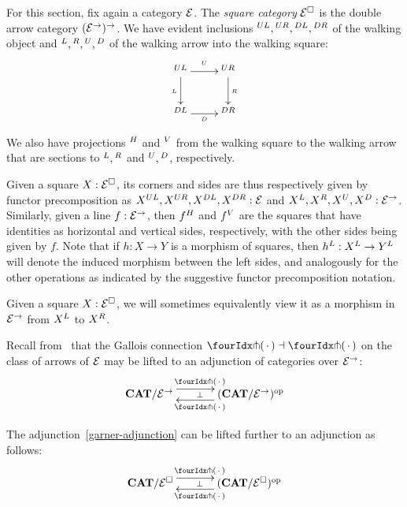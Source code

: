 \documentclass[reqno,10pt,a4paper,oneside]{amsart}
\begin{document}
For this section, fix again a category $\mathcal{E}$.
The \emph{square category} $\mathcal{E}^{\Box}$ is the double arrow category $(\mathcal{E}^{\to})^{\to}$.
We have evident inclusions ${}^{UL}, {}^{UR}, {}^{DL}, {}^{DR}$ of the walking object and ${}^L, {}^R, {}^U, {}^D$ of the walking arrow into the walking square:
\[
\xymatrix{
  \squl
  \ar[r]^{\squ}
  \ar[d]_{\sql}
  \ar@{}[dr]
&
  \squr
  \ar[d]^{\sqr}
\\
  \sqdl
  \ar[r]_{\sqd}
&
  \sqdr
}
\]
We also have projections ${}^{H}$ and ${}^{V}$ from the walking square to the walking arrow that are sections to ${}^L, {}^R$ and ${}^U, {}^D$, respectively.

Given a square $X : \mathcal{E}^{\Box}$, its corners and sides are thus respectively given by functor precomposition as $X{}^{UL}, X{}^{UR}, X{}^{DL}, X{}^{DR} : \mathcal{E}$ and $X{}^L, X{}^R, X{}^U, X{}^D : \mathcal{E}^{\to}$.
Similarly, given a line $f : \mathcal{E}^{\to}$, then $f{}^{H}$ and $f{}^{V}$ are the squares that have identities as horizontal and vertical sides, respectively, with the other sides being given by $f$.
Note that if $h : X \to Y$ is a morphism of squares, then \eg $h{}^L : X{}^L \to Y{}^L$ will denote the induced morphism between the left sides, and analogously for the other operations as indicated by the suggestive functor precomposition notation.

Given a square $X : \mathcal{E}^{\Box}$, we will sometimes equivalently view it as a morphism in $\mathcal{E}^{\to}$ from $X{}^L$ to $X{}^R$.

Recall from~\cite{garner:small-object-argument} that the Gallois connection $\liftl{\brarghole} \dashv \liftr{\brarghole}$ on the class of arrows of $\mathcal{E}$ may be lifted to an adjunction of categories over $\mathcal{E}^{\to}$:
\begin{equation}
\label{garner-adjunction}
\begin{gathered}
\xymatrix@C+1em{
  \CAT/\catE^{\to}
  \ar@<5pt>[r]^{\liftl{\brarghole}}
  \ar@{}[r]|{\bot}
&
  (\CAT/\catE^{\to})^{\op}
  \ar@<5pt>[l]^{\liftr{\brarghole}}
}
\end{gathered}
\end{equation}

\begin{lemma}
\label{garner-adjunction-extended}
The adjunction~\eqref{garner-adjunction} can be lifted further to an adjunction as follows:
\begin{equation}
\label{garner-adjunction-extended}
\begin{gathered}
\xymatrix@C+1em{
  \CAT/\catE^{\Box}
  \ar@<5pt>[r]^{\liftl{\brarghole}}
  \ar@{}[r]|{\bot}
&
  (\CAT/\catE^{\Box})^{\op}
  \ar@<5pt>[l]^{\liftr{\brarghole}}
}
\end{gathered}
\end{equation}
\end{lemma}
\end{document}
